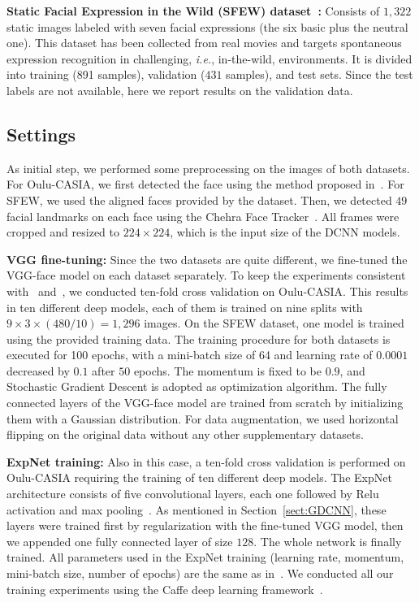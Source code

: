 \documentclass{bmvc2k}
\begin{document}
\textbf{Static Facial Expression in the Wild (SFEW) dataset~\cite{dhall2015video}:} Consists of $1,322$ static images labeled with seven facial expressions (the six basic plus the neutral one). This dataset has been collected from real movies and targets spontaneous expression recognition in challenging, \emph{i.e.}, in-the-wild, environments. It is divided into training (891 samples), validation ($431$ samples), and test sets. Since the test labels are not available, here we report results on the validation data.

\subsection{Settings}
As initial step, we performed some preprocessing on the images of both datasets. For Oulu-CASIA, we first detected the face using the method proposed in~\cite{viola2004robust}. For SFEW, we used the aligned faces provided by the dataset. Then, we detected $49$ facial landmarks on each face using the Chehra Face Tracker~\cite{asthana2014incremental}. All frames were cropped and resized to $224 \times 224$, which is the input size of the DCNN models.

\textbf{VGG fine-tuning:}
Since the two datasets are quite different, we fine-tuned the VGG-face model on each dataset separately. To keep the experiments consistent with~\cite{ding2017facenet2expnet} and~\cite{ofodile2017automatic}, we conducted ten-fold cross validation on Oulu-CASIA. This results in ten different deep models, each of them is trained on nine splits with $9 \times 3 \times(480 / 10) =1,296$ images. On the SFEW dataset, one model is trained using the provided training data. The training procedure for both datasets is executed for 100 epochs, with a mini-batch size of 64 and learning rate of $0.0001$ decreased by $0.1$ after $50$ epochs. The momentum is fixed to be $0.9$, and Stochastic Gradient Descent is adopted as optimization algorithm.
The fully connected layers of the VGG-face model are trained from scratch by initializing them with a Gaussian distribution. For data augmentation, we used horizontal flipping on the original data without any other supplementary datasets.

\textbf{ExpNet training:} Also in this case, a ten-fold cross validation is performed on Oulu-CASIA requiring the training of ten different deep models. The ExpNet architecture consists of five convolutional layers, each one followed by Relu activation and max pooling~\cite{ding2017facenet2expnet}. As mentioned in Section~\ref{sect:GDCNN}, these layers were trained first by regularization with the fine-tuned VGG model, then we appended one fully connected layer of size $128$. The whole network is finally trained. All parameters used in the ExpNet training (learning rate, momentum, mini-batch size, number of epochs) are the same as in~\cite{ding2017facenet2expnet}. 
We conducted all our training experiments using the Caffe deep learning framework~\cite{jia2014caffe}.
\end{document}
